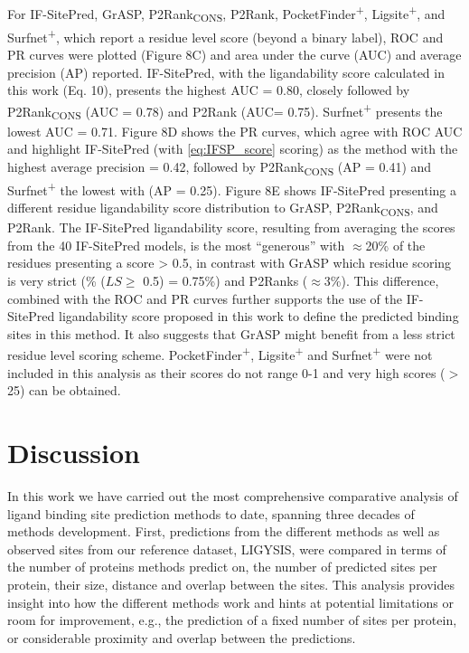 For IF-SitePred, GrASP, P2Rank\textsubscript{CONS}, P2Rank, PocketFinder\textsuperscript{+}, Ligsite\textsuperscript{+}, and Surfnet\textsuperscript{+}, which report a residue level score (beyond a binary label), ROC and PR curves were plotted (Figure 8C) and area under the curve (AUC) and average precision (AP) reported. IF-SitePred, with the ligandability score calculated in this work (Eq. 10), presents the highest AUC = 0.80, closely followed by P2Rank\textsubscript{CONS} (AUC = 0.78) and P2Rank (AUC= 0.75). Surfnet\textsuperscript{+} presents the lowest AUC = 0.71. Figure 8D shows the PR curves, which agree with ROC AUC and highlight IF-SitePred (with \autoref{eq:IFSP_score} scoring) as the method with the highest average precision = 0.42, followed by P2Rank\textsubscript{CONS} (AP = 0.41) and Surfnet\textsuperscript{+} the lowest with (AP = 0.25). Figure 8E shows IF-SitePred presenting a different residue ligandability score distribution to GrASP, P2Rank\textsubscript{CONS}, and P2Rank. The IF-SitePred ligandability score, resulting from averaging the scores from the 40 IF-SitePred models, is the most ``generous'' with $\approx$20\% of the residues presenting a score > 0.5, in contrast with GrASP which residue scoring is very strict (\% ($LS \geq$ 0.5) = 0.75\%) and P2Ranks ($\approx$3\%). This difference, combined with the ROC and PR curves further supports the use of the IF-SitePred ligandability score proposed in this work to define the predicted binding sites in this method. It also suggests that GrASP might benefit from a less strict residue level scoring scheme. PocketFinder\textsuperscript{+}, Ligsite\textsuperscript{+} and Surfnet\textsuperscript{+} were not included in this analysis as their scores do not range 0-1 and very high scores ($>$25) can be obtained.

\section{Discussion}

In this work we have carried out the most comprehensive comparative analysis of ligand binding site prediction methods to date, spanning three decades of methods development. First, predictions from the different methods as well as observed sites from our reference dataset, LIGYSIS, were compared in terms of the number of proteins methods predict on, the number of predicted sites per protein, their size, distance and overlap between the sites. This analysis provides insight into how the different methods work and hints at potential limitations or room for improvement, e.g., the prediction of a fixed number of sites per protein, or considerable proximity and overlap between the predictions.

